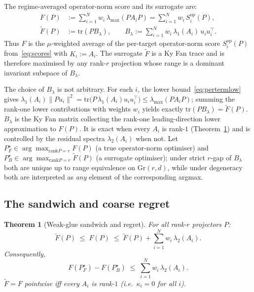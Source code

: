 \documentclass[final,3p,times]{elsarticle}
\newtheorem{theorem}{Theorem}
\newcommand{\Gr}{\mathrm{Gr}}
\newcommand{\tr}{\mathrm{tr}}
\newcommand{\rank}{\mathrm{rank}}
\begin{document}
The regime-averaged operator-norm score and its surrogate are:
\begin{align}
F(P) &:= \sum_{i=1}^N w_i\,\lambda_{\max}(P A_i P)
        =\sum_{i=1}^N w_i\,S^{\mathrm{op}}_i(P), \label{eq:F}\\
\tilde F(P) &:= \tr(P B_\lambda),\qquad
B_\lambda := \sum_{i=1}^N w_i\,\lambda_1(A_i)\,u_i u_i^\top.
\label{eq:Btilde}
\end{align}
Thus $F$ is the $\mu$-weighted average of the per-target operator-norm
score $S^{\mathrm{op}}_i(P)$ from~\eqref{eq:scores} with $K_i:=A_i$.
The surrogate $\tilde F$ is a Ky Fan trace and is therefore maximised by
any rank-$r$ projection whose range is a dominant invariant subspace of
$B_\lambda$.

The choice of $B_\lambda$ is not arbitrary.
For each $i$, the lower bound~\eqref{eq:pertermlow} gives
$\lambda_1(A_i)\|Pu_i\|^2=\tr\!\bigl(P\,\lambda_1(A_i)u_iu_i^\top\bigr)
\le\lambda_{\max}(PA_iP)$;
summing the rank-one lower contributions with weights $w_i$ yields
exactly $\tr(PB_\lambda)=\tilde F(P)$.
$B_\lambda$ is the Ky Fan matrix collecting the rank-one
leading-direction lower approximation to $F(P)$.
It is exact when every $A_i$ is rank-$1$ (Theorem~\ref{thm:weakglue})
and is controlled by the residual spectra $\lambda_2(A_i)$ when not.
Let $P_F^\star\in\arg\max_{\rank P=r} F(P)$ (a true operator-norm optimiser)
and $P_B^\star\in\arg\max_{\rank P=r}\tilde F(P)$ (a surrogate optimiser);
under strict $r$-gap of $B_\lambda$ both are unique up to range
equivalence on $\Gr(r,d)$, while under degeneracy both are interpreted as
\emph{any} element of the corresponding argmax.

\subsection{The sandwich and coarse regret}

\begin{theorem}[Weak-glue sandwich and regret]\label{thm:weakglue}
For all rank-$r$ projectors $P$:
\begin{equation}\label{eq:sandwich}
\tilde F(P)\;\le\;F(P)\;\le\;\tilde F(P)+\sum_{i=1}^N w_i\,\lambda_2(A_i).
\end{equation}
Consequently,
\begin{equation}\label{eq:coarse}
F(P_F^\star)-F(P_B^\star)\;\le\;\sum_{i=1}^N w_i\,\lambda_2(A_i).
\end{equation}
$\tilde F=F$ pointwise iff every $A_i$ is rank-$1$ (i.e.\ $\kappa_i=0$
for all $i$).
\end{theorem}
\end{document}
